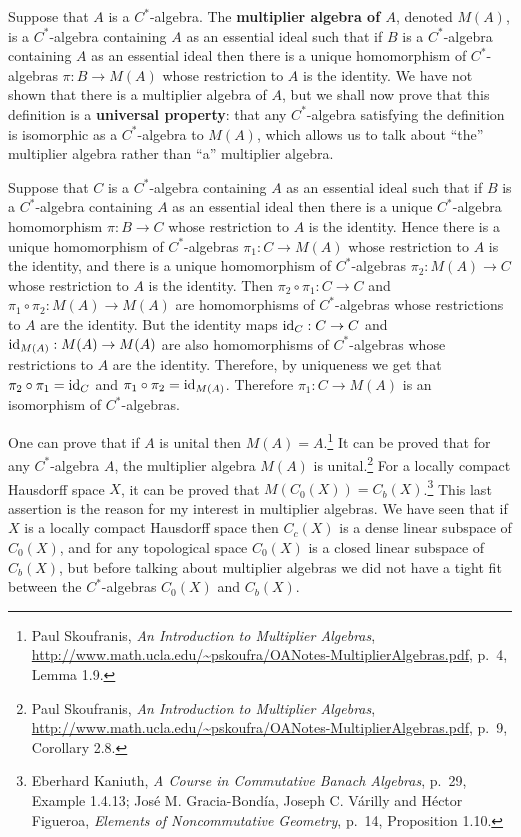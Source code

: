 \documentclass{article}
\newcommand{\id}{\ensuremath\mathrm{id}}
\theoremstyle{definition}
\begin{document}
Suppose that $A$ is a $C^*$-algebra. The \textbf{multiplier algebra of $A$}, denoted $M(A)$, is
a  $C^*$-algebra containing $A$ as an essential
ideal such that if $B$ is a $C^*$-algebra containing $A$ as an essential ideal then there is
a unique homomorphism of $C^*$-algebras $\pi:B \to M(A)$ whose restriction to $A$ is the identity.
We have not shown that there is a multiplier algebra of $A$, but we shall now prove that this definition is a \textbf{universal property}:
that any $C^*$-algebra satisfying the definition is isomorphic as a $C^*$-algebra to $M(A)$, which allows us to talk about ``the'' multiplier algebra
rather than ``a'' multiplier algebra.

Suppose that $C$ is a $C^*$-algebra containing $A$ as an essential ideal such that
if $B$ is a $C^*$-algebra containing $A$ as an essential ideal then there is a unique $C^*$-algebra homomorphism
$\pi:B \to C$ whose restriction to $A$ is the identity. 
Hence there is a unique homomorphism of $C^*$-algebras $\pi_1:C \to M(A)$ whose restriction to $A$ is the identity,
and there is a unique homomorphism of $C^*$-algebras $\pi_2:M(A) \to C$ whose restriction to $A$ is the identity.
Then $\pi_2 \circ \pi_1:C \to C$ and $\pi_1 \circ \pi_2:M(A) \to M(A)$ are  homomorphisms of $C^*$-algebras
whose restrictions to $A$ are the identity. But the identity maps $\id_C:C \to C$ and $\id_{M(A)}:M(A) \to M(A)$ are also homomorphisms
of $C^*$-algebras whose restrictions to $A$ are the identity. Therefore, 
by uniqueness we get that $\pi_2 \circ \pi_1 = \id_C$ and $\pi_1 \circ \pi_2 = \id_{M(A)}$. 
Therefore $\pi_1:C \to M(A)$ is an isomorphism of $C^*$-algebras.

One can prove that if $A$ is unital then $M(A)=A$.\footnote{Paul Skoufranis,
{\em An Introduction to Multiplier Algebras},
\url{http://www.math.ucla.edu/~pskoufra/OANotes-MultiplierAlgebras.pdf}, p.~4, Lemma 1.9.}
It can be proved that for any $C^*$-algebra $A$, the multiplier algebra $M(A)$ is unital.\footnote{Paul Skoufranis,
{\em An Introduction to Multiplier Algebras},
\url{http://www.math.ucla.edu/~pskoufra/OANotes-MultiplierAlgebras.pdf}, p.~9, Corollary 2.8.}
For a locally compact Hausdorff space $X$, it can be proved that $M(C_0(X))=C_b(X)$.\footnote{Eberhard
Kaniuth, {\em A Course in Commutative Banach Algebras}, p.~29, Example 1.4.13;
Jos\'e M. Gracia-Bond\'ia, Joseph C. V\'arilly and
H\'ector Figueroa, {\em Elements of Noncommutative Geometry}, p.~14, Proposition 1.10.} This last assertion is the reason for my interest in multiplier algebras. We have
seen that if $X$ is a locally compact Hausdorff space then $C_c(X)$ is a dense linear subspace of $C_0(X)$, and for any topological space $C_0(X)$ is a closed linear
subspace of $C_b(X)$, but before talking about multiplier algebras we did not have a tight fit between the $C^*$-algebras $C_0(X)$ and $C_b(X)$.
\end{document}
